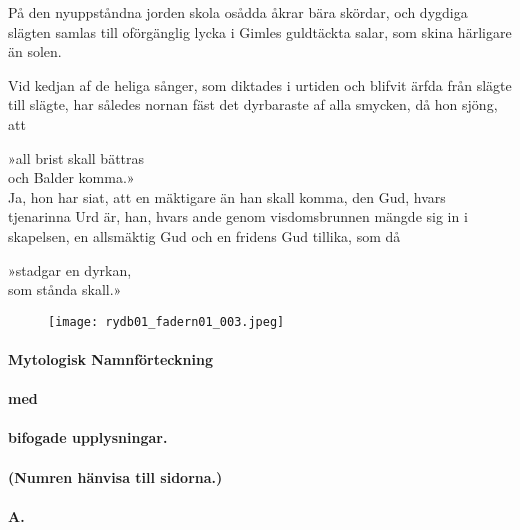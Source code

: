 På den nyuppståndna jorden skola osådda åkrar bära skördar, och dygdiga
slägten samlas till oförgänglig lycka i Gimles guldtäckta salar, som
skina härligare än solen.

Vid kedjan af de heliga sånger, som diktades i urtiden och blifvit ärfda
från slägte till slägte, har således nornan fäst det dyrbaraste af alla
smycken, då hon sjöng, att

{»all brist skall bättras}\\
{och Balder komma.»}\\

Ja, hon har siat, att en mäktigare än han skall komma, den Gud, hvars
tjenarinna Urd är, han, hvars ande genom visdomsbrunnen mängde sig in i
skapelsen, en allsmäktig Gud och en fridens Gud tillika, som då

{»stadgar en dyrkan,}\\
{som stånda skall.»}\\

\begin{figure}
\centering
\texttt{[image: rydb01\_fadern01\_003.jpeg]}
\caption{}
\end{figure}

\protect\hypertarget{lb1625905.xhtmlux5cux23start198}{}{}\protect\hypertarget{lb1625905.xhtmlux5cux23start198-a}{}{}\protect\hypertarget{lb1625905.xhtmlux5cux23start198-b}{}{}\protect\hypertarget{lb1625905.xhtmlux5cux23start198-c}{}{}\protect\hypertarget{lb1625905.xhtmlux5cux23start198-d}{}{}

\paragraph{\texorpdfstring{{Mytologisk
Namnförteckning}}{Mytologisk Namnförteckning}}

\paragraph{med}

\paragraph{bifogade upplysningar.}

\paragraph{(Numren hänvisa till sidorna.)}

\paragraph{A.}

